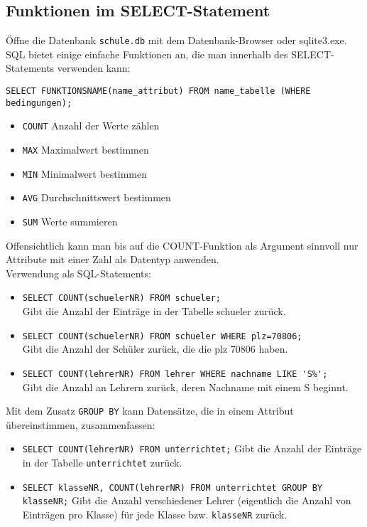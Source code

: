 \subsection[Funktionen]{Funktionen im SELECT-Statement}
Öffne die Datenbank \texttt{schule.db} mit dem Datenbank-Browser oder sqlite3.exe.\\
SQL bietet einige einfache Funktionen an, die man innerhalb des SELECT-Statements verwenden kann:
\begin{tcolorbox}[title=Funktionen in SQL]
	\lstinline!SELECT FUNKTIONSNAME(name_attribut) FROM name_tabelle (WHERE bedingungen);!
\end{tcolorbox}
\begin{itemize}
	\item \lstinline!COUNT!	Anzahl der Werte zählen
	\item \lstinline!MAX!	Maximalwert bestimmen
	\item \lstinline!MIN!	Minimalwert bestimmen
	\item \lstinline!AVG!	Durchschnittswert bestimmen
	\item \lstinline!SUM!	Werte summieren
\end{itemize}

Offensichtlich kann man bis auf die COUNT-Funktion als Argument sinnvoll nur Attribute mit einer Zahl als Datentyp anwenden.\\
Verwendung als SQL-Statements:
\begin{itemize}
	\item \lstinline!SELECT COUNT(schuelerNR) FROM schueler;!\\
	Gibt die Anzahl der Einträge in der Tabelle schueler zurück.
	\item \lstinline!SELECT COUNT(schuelerNR) FROM schueler WHERE plz=70806;!\\
	Gibt die Anzahl der Schüler zurück, die die plz 70806 haben.
	\item \lstinline!SELECT COUNT(lehrerNR) FROM lehrer WHERE nachname LIKE 'S%';!\\
	Gibt die Anzahl an Lehrern zurück, deren Nachname mit einem S beginnt.
\end{itemize}
Mit dem Zusatz \lstinline!GROUP BY! kann Datensätze, die in einem Attribut übereinstimmen, zusammenfassen:
\begin{itemize}
	\item \lstinline!SELECT COUNT(lehrerNR) FROM unterrichtet;!
	Gibt die Anzahl der Einträge in der Tabelle \lstinline!unterrichtet! zurück.
	\item \lstinline!SELECT klasseNR, COUNT(lehrerNR) FROM unterrichtet GROUP BY klasseNR;!
	Gibt die Anzahl verschiedener Lehrer (eigentlich die Anzahl von Einträgen pro Klasse) für jede Klasse bzw. \lstinline!klasseNR! zurück.
\end{itemize}

